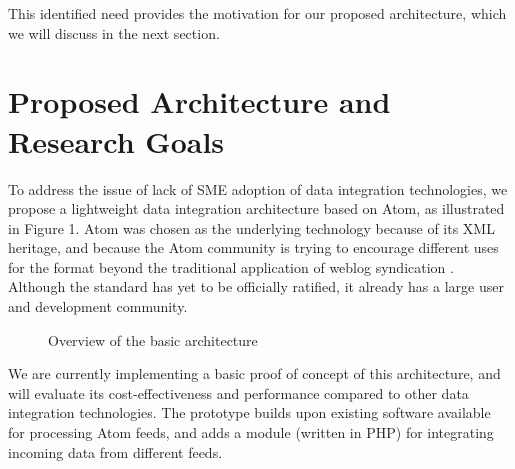\documentclass{CRPITStyle}
\begin{document}
This identified need provides the motivation for our proposed
architecture, which we will discuss in the next section.


\section{Proposed Architecture and Research Goals}
\label{sec-architecture}

To address the issue of lack of SME adoption of data integration
technologies, we propose a lightweight data integration architecture
based on Atom, as illustrated in Figure 1. Atom was chosen as the
underlying technology because of its XML heritage, and because the Atom
community is trying to encourage different uses for the format beyond
the traditional application of weblog syndication
\cite{Nott-M-2005-Atom}. Although the standard has yet to be officially
ratified, it already has a large user and development community.

\begin{figure}[htb]
	\caption{Overview of the basic architecture}
	\label{fig-basic}
\end{figure}

We are currently implementing a basic proof of concept of this
architecture, and will evaluate its cost-effectiveness and performance
compared to other data integration technologies. The prototype builds
upon existing software available for processing Atom feeds, and adds a
module (written in PHP) for integrating incoming data from different
feeds.
\end{document}
